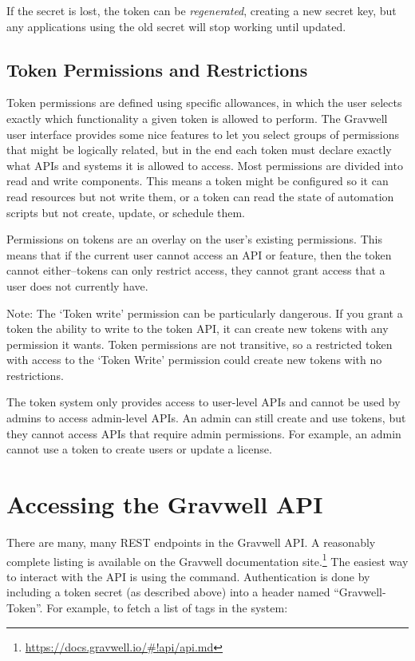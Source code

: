 If the secret is lost, the token can be \emph{regenerated}, creating a new secret key, but any applications using the old secret will stop working until updated.

\subsection{Token Permissions and Restrictions}
Token permissions are defined using specific allowances, in which the user selects exactly which functionality a given token is allowed to perform.  The Gravwell user interface provides some nice features to let you select groups of permissions that might be logically related, but in the end each token must declare exactly what APIs and systems it is allowed to access.  Most permissions are divided into read and write components.  This means a token might be configured so it can read resources but not write them, or a token can read the state of automation scripts but not create, update, or schedule them.

Permissions on tokens are an overlay on the user's existing permissions.  This means that if the current user cannot access an API or feature, then the token cannot either--tokens can only restrict access, they cannot grant access that a user does not currently have.

Note: The `Token write' permission can be particularly dangerous. If you grant a token the ability to write to the token API, it can create new tokens with any permission it wants.  Token permissions are not transitive, so a restricted token with access to the `Token Write' permission could create new tokens with no restrictions.

The token system only provides access to user-level APIs and cannot be used by admins to access admin-level APIs.  An admin can still create and use tokens, but they cannot access APIs that require admin permissions.  For example, an admin cannot use a token to create users or update a license.

\section{Accessing the Gravwell API}

There are many, many REST endpoints in the Gravwell API. A reasonably complete listing is available on the Gravwell documentation site.\footnote{\href{https://docs.gravwell.io/\#!api/api.md}{https://docs.gravwell.io/\#!api/api.md}} The easiest way to interact with the API is using the  command. Authentication is done by including a token secret (as described above) into a header named ``Gravwell-Token''. For example, to fetch a list of tags in the system:

